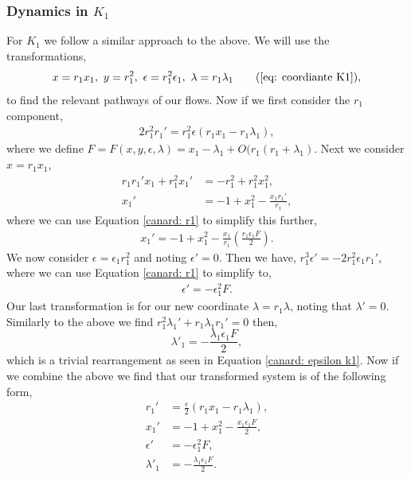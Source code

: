 \subsubsection{Dynamics in \texorpdfstring{$K_1$}{K1}}\label{sec:dynamics-in-texorpdfstringk1k1}
For $K_1$ we follow a similar approach to the above. We will use the transformations, 
\begin{equation}
x=r_1x_1, \ y=r_1^2, \ \epsilon=r_1^2\epsilon_1, \ \lambda=r_1\lambda_1 \tag{\ref{eq: coordiante K1}},
\end{equation}
to find the relevant pathways of our flows. Now if we first consider the $r_1$ component, 
\begin{align}
2r_1^2r_1'=r_1^2\epsilon(r_1x_1-r_1\lambda_1), \label{canard: r1}
\end{align}
where we define $F=F(x,y,\epsilon,\lambda)=x_1-\lambda_1+O(r_1(r_1+\lambda_1)$. Next we consider $x=r_1x_1$,
\begin{align*}
r_1r_1'x_1+r_1^2x_1'&=-r_1^2+r_1^2x_1^2,\\
x_1'&=-1+x_1^2-\frac{x_1r_1'}{r_1},
\end{align*}
where we can use Equation \ref{canard: r1} to simplify this further,
\begin{align}
x_1'=-1+x_1^2-\frac{x_1}{r_1}\left(\frac{r_1\epsilon_1F}{2}\right). \label{eq: canard x1}
\end{align}
We now consider $\epsilon=\epsilon_1r_1^2$ and noting $\epsilon'=0$. Then we have, $r_1^3\epsilon'=-2r_1^2\epsilon_1r_1'$, where we can use Equation \ref{canard: r1} to simplify to,
\begin{align}
\epsilon'=-\epsilon_1^2F. \label{canard: epsilon k1}
\end{align}
Our last transformation is for our new coordinate $\lambda=r_1\lambda$, noting that $\lambda'=0$. Similarly to the above we find $r_1^2\lambda_1'+r_1\lambda_1r_1'=0$ then, 
\begin{equation}
\lambda'_1=-\frac{\lambda_1\epsilon_1F}{2}, 
\end{equation}
which is a trivial rearrangement as seen in Equation \ref{canard: epsilon k1}. Now if we combine the above we find that our transformed system is of the following form,
\begin{subequations}
	\begin{align}
	r_1'&=\frac{\epsilon}{2}(r_1x_1-r_1\lambda_1), \\
	x_1'&=-1+x_1^2-\frac{x_1\epsilon_1F}{2},\\
	\epsilon'&=-\epsilon_1^2F,\\
	\lambda'_1&=-\frac{\lambda_1\epsilon_1F}{2}.
	\end{align}
	\label{canard: system of equations}
\end{subequations}
